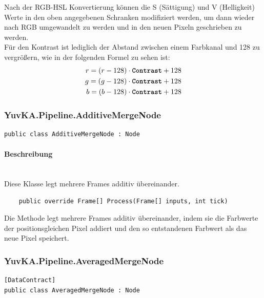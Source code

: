 \begin{itemize}
	Nach der RGB-HSL Konvertierung können die S (Sättigung) und V (Helligkeit) Werte in den oben angegebenen Schranken modifiziert werden, um dann wieder nach RGB umgewandelt zu werden und in den neuen Pixeln geschrieben zu werden. \\
	Für den Kontrast ist lediglich der Abstand zwischen einem Farbkanal und 128 zu vergrößern, wie in der folgenden Formel zu sehen ist: \begin{eqnarray*}
   r = (r - 128) \cdot \text{\textbf{\texttt{Contrast}}} + 128 \\
	g = (g - 128) \cdot \text{\textbf{\texttt{Contrast}}} + 128 \\
	b = (b - 128) \cdot \text{\textbf{\texttt{Contrast}}} + 128
\end{eqnarray*}

\end{itemize}

\subsubsection{YuvKA.Pipeline.AdditiveMergeNode}

\begin{verbatim}
public class AdditiveMergeNode : Node
\end{verbatim}

\paragraph{Beschreibung}~\\
Diese Klasse  legt mehrere Frames additiv übereinander.

\begin{itemize}

\begin{verbatim}
	public override Frame[] Process(Frame[] inputs, int tick)
\end{verbatim}
Die Methode  legt mehrere Frames additiv übereinander, indem sie die Farbwerte der positionsgleichen Pixel addiert und den so entstandenen Farbwert als das neue Pixel speichert.
\end{itemize}

\subsubsection{YuvKA.Pipeline.AveragedMergeNode}

\begin{verbatim}
[DataContract]
public class AveragedMergeNode : Node
\end{verbatim}

